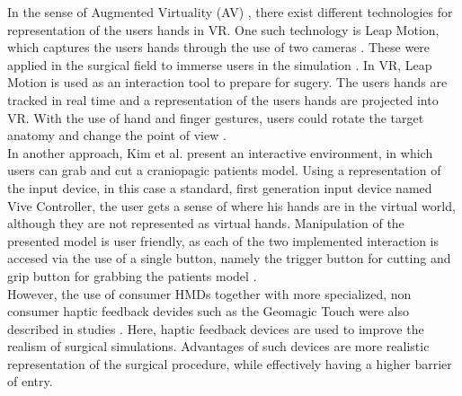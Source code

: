 In the sense of Augmented Virtuality (AV) \cite{milgram1994taxonomy}, there exist different technologies for representation of the users hands in VR.
One such technology is Leap Motion, which captures the users hands through the use of two cameras \cite{LeapMotion}.
These were applied in the surgical field to immerse users in the simulation \cite{VenkataS.Arikatla.2018,Sampogna.2017}.
In VR, Leap Motion is used as an interaction tool to prepare for sugery.
The users hands are tracked in real time and a representation of the users hands are projected into VR.
With the use of hand and finger gestures, users could rotate the target anatomy and change the point of view \cite{Sampogna.2017}.
\\ In another approach, Kim et al. present an interactive environment, in which users can grab and cut a craniopagic patients model.
Using a representation of the input device, in this case a standard, first generation input device named Vive Controller, the user gets a sense of where his hands are in the virtual world, although they are not represented as virtual hands. 
Manipulation of the presented model is user friendly, as each of the two implemented interaction is accesed via the use of a single button, namely the trigger button for cutting and grip button for grabbing the patients model \cite{.2017}.
\\ However, the use of consumer HMDs together with more specialized, non consumer haptic feedback devides such as the Geomagic Touch were also described in studies \cite{VenkataS.Arikatla.2018}.
Here, haptic feedback devices are used to improve the realism of surgical simulations.
Advantages of such devices are more realistic representation of the surgical procedure, while effectively having a higher barrier of entry.